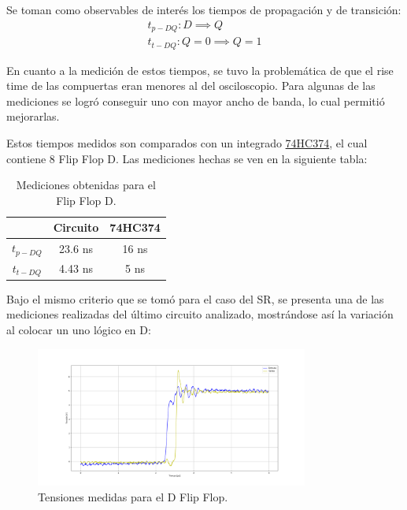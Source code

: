 Se toman como observables de interés los tiempos de propagación y de transición:
\begin{equation*}
\begin{split}
	t_{p-DQ}: D \implies Q \\
	t_{t-DQ}: Q=0 \implies Q = 1
\end{split}
\end{equation*}
 
En cuanto a la medición de estos tiempos, se tuvo la problemática de que el rise time de las compuertas eran menores al del osciloscopio. Para algunas de las mediciones se logró conseguir uno con mayor ancho de banda, lo cual permitió mejorarlas.

Estos tiempos medidos son comparados con un integrado \href{https://pdf1.alldatasheet.com/datasheet-pdf/view/15593/PHILIPS/74HC374.html}{74HC374}, el cual contiene 8 Flip Flop D. Las mediciones hechas se ven en la siguiente tabla:
\begin{table}[H]
\centering
\begin{tabular}{ccc}
\hline
\textit{}                               & \textbf{Circuito}         & \textbf{74HC374}     \\ \hline
\textbf{$t_{p-DQ}$}                     & 23.6 ns                    & 16 ns                 \\
\textbf{$t_{t-DQ}$}                     & 4.43 ns                    & 5 ns                  \\
\hline
\end{tabular}
\caption{Mediciones obtenidas para el Flip Flop D.}
\label{tab:ffd}
\end{table}

Bajo el mismo criterio que se tomó para el caso del SR, se presenta una de las mediciones realizadas del último circuito analizado, mostrándose así la variación al colocar un uno lógico en D:
\begin{figure}[H]	
	\centering
	\includegraphics[width=0.8\textwidth]{ImagenesEjercicio6/Medicion-DFF.png}
	\caption{Tensiones medidas para el D Flip Flop.}
	\label{fig:meddff}
\end{figure}

